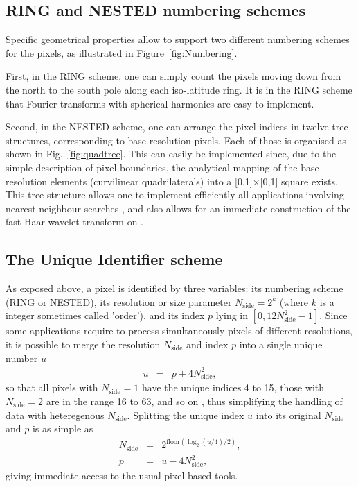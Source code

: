 \documentclass[12pt,twoside]{article}
\makeatletter
\newcommand{\myhtmlimage}[1]{ }
\newcommand{\myequal}{=}
\renewcommand{\myequal}{$=$}
\newcommand{\nop}[1]{\Hy@raisedlink{\hypertarget{#1}{}}}
\newcommand{\mytarget}[1]{\nop{#1}}%
\newcommand{\mytarget}[1]{\label{#1}}
\newcommand{\nside}{N_{\mathrm{side}}}
\makeatother
\begin{document}
\subsection{RING and NESTED numbering schemes}
Specific geometrical properties allow \healpix to support two different
numbering schemes for the pixels, as illustrated in Figure~\ref{fig:Numbering}. 

First, in the RING scheme, 
one can simply count the pixels moving down from the north 
to the south pole along each
iso-latitude ring. It is in the RING scheme that Fourier transforms 
with spherical harmonics
are easy to implement.

Second, in the NESTED scheme, one can arrange the pixel indices 
in  twelve tree structures, corresponding to base-resolution pixels.
Each of those is organised as shown in Fig.~\ref{fig:quadtree}. %
This can easily be implemented
since, due to the simple 
description of pixel boundaries, the analytical mapping of the \healpix
base-resolution elements (curvilinear
quadrilaterals) into a [0,1]$\times$[0,1] square exists.
This tree structure allows one to implement efficiently all
applications involving  nearest-neighbour searches
\citep{whg},
and also allows for an immediate
construction of the fast Haar wavelet transform on \healpixns. 

\subsection{The Unique Identifier scheme}
\label{intro:unique}
As exposed above, a \healpix pixel is identified by three variables:
its numbering scheme (RING or NESTED), 
its resolution or size parameter $\nside = 2^k$ (where $k$ is a integer sometimes called 'order'),
and its index $p$ lying in $[0, 12\nside^2-1]$.
Since some applications require to process simultaneously pixels of different resolutions, it is possible
to merge the resolution $\nside$ and index $p$ into a single unique number $u$
\begin{eqnarray}
	u &=& p + 4 \nside^2, \myhtmlimage{} \label{eq:nest2uniq}
\end{eqnarray}
so that all pixels with $\nside=1$ have the unique indices 4 to 15, 
those with $\nside=2$ are in the range 16 to 63, and so on \citep{rh15}, 
thus simplifying the handling of data with heteregenous $\nside$.
Splitting the unique index $u$ into its original $\nside$ and $p$ is as simple as
\begin{eqnarray}
	\nside &=& 2^{\mathrm{floor}\left( \log_2(u/4)/2 \right)}, \myhtmlimage{} \label{eq:ring2nest_a}\\
	     p &=& u - 4 \nside^2, \myhtmlimage{} \label{eq:ring2nest_b}
\end{eqnarray}
giving immediate access to the usual pixel based tools.
\end{document}
